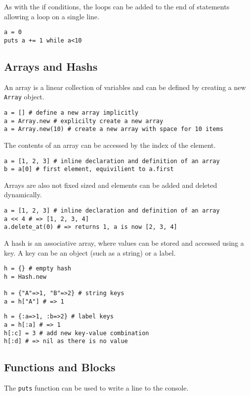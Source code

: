 \begin{bibunit}
As with the if conditions, the loops can be added to the end of statements allowing a loop on a single line.

\begin{lstlisting}
a = 0
puts a += 1 while a<10
\end{lstlisting}

\subsection{Arrays and Hashs}
An array is a linear collection of variables and can be defined by creating a new \texttt{Array} object.

\begin{lstlisting}
a = [] # define a new array implicitly
a = Array.new # explicilty create a new array
a = Array.new(10) # create a new array with space for 10 items
\end{lstlisting}

The contents of an array can be accessed by the index of the element. 

\begin{lstlisting}
a = [1, 2, 3] # inline declaration and definition of an array
b = a[0] # first element, equivilient to a.first
\end{lstlisting}

Arrays are also not fixed sized and elements can be added and deleted dynamically.
\begin{lstlisting}
a = [1, 2, 3] # inline declaration and definition of an array
a << 4 # => [1, 2, 3, 4]
a.delete_at(0) # => returns 1, a is now [2, 3, 4]
\end{lstlisting}

A hash is an associative array, where values can be stored and accessed using a key. A key can be an object (such as a string) or a label. 

\begin{lstlisting}
h = {} # empty hash
h = Hash.new

h = {"A"=>1, "B"=>2} # string keys 
a = h["A"] # => 1
\end{lstlisting}

\begin{lstlisting}
h = {:a=>1, :b=>2} # label keys 
a = h[:a] # => 1
h[:c] = 3 # add new key-value combination
h[:d] # => nil as there is no value
\end{lstlisting}

\subsection{Functions and Blocks}
The \texttt{puts} function can be used to write a line to the console.


\end{bibunit}
